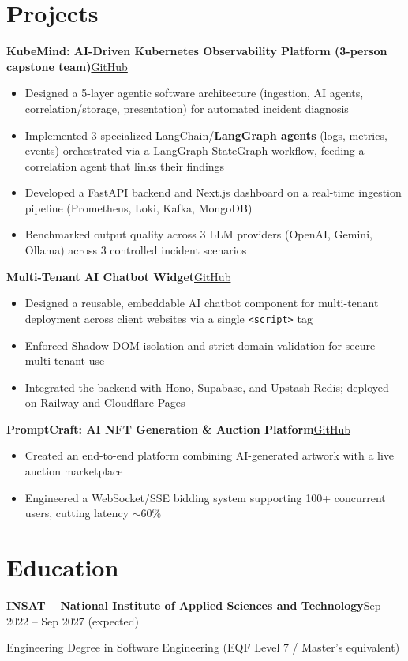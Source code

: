 \documentclass[10pt,a4paper]{article}
\newcommand{\entry}[2]{\vspace{1pt}\noindent\textbf{#1}\hfill{\color{muted}#2}\par}
\newcommand{\gh}[1]{\href{https://github.com/Hsan003/#1}{GitHub}}
\begin{document}
\section{Projects}
\entry{KubeMind: AI-Driven Kubernetes Observability Platform (3-person capstone team)}{\gh{kubemind}}
\begin{itemize}
  \item Designed a 5-layer agentic software architecture (ingestion, AI agents, correlation/storage, presentation) for automated incident diagnosis
  \item Implemented 3 specialized LangChain/\textbf{LangGraph agents} (logs, metrics, events) orchestrated via a LangGraph StateGraph workflow, feeding a correlation agent that links their findings
  \item Developed a FastAPI backend and Next.js dashboard on a real-time ingestion pipeline (Prometheus, Loki, Kafka, MongoDB)
  \item Benchmarked output quality across 3 LLM providers (OpenAI, Gemini, Ollama) across 3 controlled incident scenarios
\end{itemize}
\entry{Multi-Tenant AI Chatbot Widget}{\gh{AI-Assistant-Backend}}
\begin{itemize}
  \item Designed a reusable, embeddable AI chatbot component for multi-tenant deployment across client websites via a single \texttt{<script>} tag
  \item Enforced Shadow DOM isolation and strict domain validation for secure multi-tenant use
  \item Integrated the backend with Hono, Supabase, and Upstash Redis; deployed on Railway and Cloudflare Pages
\end{itemize}
\entry{PromptCraft: AI NFT Generation \& Auction Platform}{\gh{prompt-craft-back}}
\begin{itemize}
  \item Created an end-to-end platform combining AI-generated artwork with a live auction marketplace
  \item Engineered a WebSocket/SSE bidding system supporting 100+ concurrent users, cutting latency $\sim$60\%
\end{itemize}

\section{Education}
\entry{INSAT -- National Institute of Applied Sciences and Technology}{Sep 2022 -- Sep 2027 (expected)}
Engineering Degree in Software Engineering (EQF Level 7 / Master's equivalent)
\end{document}
